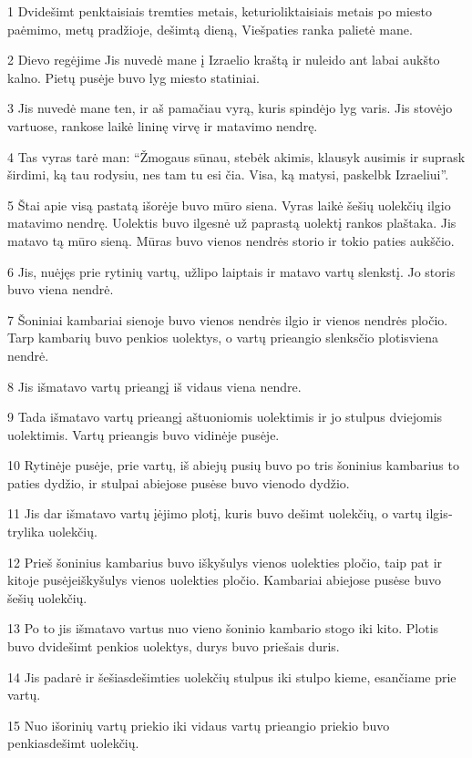 \par 1 Dvidešimt penktaisiais tremties metais, keturioliktaisiais metais po miesto paėmimo, metų pradžioje, dešimtą dieną, Viešpaties ranka palietė mane. 
\par 2 Dievo regėjime Jis nuvedė mane į Izraelio kraštą ir nuleido ant labai aukšto kalno. Pietų pusėje buvo lyg miesto statiniai. 
\par 3 Jis nuvedė mane ten, ir aš pamačiau vyrą, kuris spindėjo lyg varis. Jis stovėjo vartuose, rankose laikė lininę virvę ir matavimo nendrę. 
\par 4 Tas vyras tarė man: “Žmogaus sūnau, stebėk akimis, klausyk ausimis ir suprask širdimi, ką tau rodysiu, nes tam tu esi čia. Visa, ką matysi, paskelbk Izraeliui”. 
\par 5 Štai apie visą pastatą išorėje buvo mūro siena. Vyras laikė šešių uolekčių ilgio matavimo nendrę. Uolektis buvo ilgesnė už paprastą uolektį rankos plaštaka. Jis matavo tą mūro sieną. Mūras buvo vienos nendrės storio ir tokio paties aukščio. 
\par 6 Jis, nuėjęs prie rytinių vartų, užlipo laiptais ir matavo vartų slenkstį. Jo storis buvo viena nendrė. 
\par 7 Šoniniai kambariai sienoje buvo vienos nendrės ilgio ir vienos nendrės pločio. Tarp kambarių buvo penkios uolektys, o vartų prieangio slenksčio plotis­viena nendrė. 
\par 8 Jis išmatavo vartų prieangį iš vidaus viena nendre. 
\par 9 Tada išmatavo vartų prieangį aštuoniomis uolektimis ir jo stulpus dviejomis uolektimis. Vartų prieangis buvo vidinėje pusėje. 
\par 10 Rytinėje pusėje, prie vartų, iš abiejų pusių buvo po tris šoninius kambarius to paties dydžio, ir stulpai abiejose pusėse buvo vienodo dydžio. 
\par 11 Jis dar išmatavo vartų įėjimo plotį, kuris buvo dešimt uolekčių, o vartų ilgis­trylika uolekčių. 
\par 12 Prieš šoninius kambarius buvo iškyšulys vienos uolekties pločio, taip pat ir kitoje pusėje­iškyšulys vienos uolekties pločio. Kambariai abiejose pusėse buvo šešių uolekčių. 
\par 13 Po to jis išmatavo vartus nuo vieno šoninio kambario stogo iki kito. Plotis buvo dvidešimt penkios uolektys, durys buvo priešais duris. 
\par 14 Jis padarė ir šešiasdešimties uolekčių stulpus iki stulpo kieme, esančiame prie vartų. 
\par 15 Nuo išorinių vartų priekio iki vidaus vartų prieangio priekio buvo penkiasdešimt uolekčių. 
